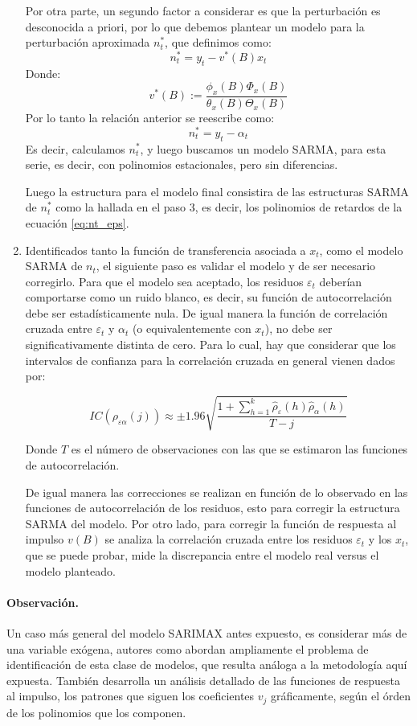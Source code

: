 \documentclass[12pt,oneside]{book}\usepackage[]{graphicx}\usepackage[]{color}
\theoremstyle{definition} %
\begin{document}
\begin{enumerate}
Por otra parte, un segundo factor a considerar es que la perturbación es desconocida a priori, por lo que debemos plantear un modelo para la perturbación aproximada $n_t^{*}$, que definimos como:
$$n_t^{*} = y_t - v^{*}(B)x_t$$
Donde:
$$v^{*}(B):=\frac{ \phi_x(B) \Phi_x(B) }{\theta_x(B) \Theta_x(B)}$$
Por lo tanto la relación anterior se reescribe como:
$$n_t^{*} = y_t -\alpha_t$$
Es decir, calculamos $n_t^{*}$, y luego buscamos un modelo SARMA, para esta serie, es decir, con polinomios estacionales, pero sin diferencias. 

Luego la estructura para el modelo final consistira de las estructuras SARMA de $n_t^{*}$ como la hallada en el paso 3, es decir, los polinomios de retardos de la ecuación \ref{eq:nt_eps}.

\item Identificados tanto la función de transferencia asociada a $x_t$, como el modelo SARMA de $n_t$, el siguiente paso es validar el modelo y de ser necesario corregirlo. Para que el modelo sea aceptado, los residuos $\varepsilon_t$ deberían comportarse como un ruido blanco, es decir, su función de autocorrelación debe ser estadísticamente nula. De igual manera la función de correlación cruzada entre $\varepsilon_t$ y $\alpha_t$ (o equivalentemente con $x_t$), no debe ser significativamente distinta de cero. Para lo cual, hay que considerar que los intervalos de confianza para la correlación cruzada en general vienen dados por:

$$IC(\rho_{\varepsilon\alpha}(j) ) \approx \pm 1.96 \sqrt{ \frac{1+\sum_{h=1}^k \hat\rho_\varepsilon(h) \hat\rho_\alpha(h) }{T-j} } $$

Donde $T$ es el número de observaciones con las que se estimaron las funciones de autocorrelación.

De igual manera las correcciones se realizan en función de lo observado en las funciones de autocorrelación de los residuos, esto para corregir la estructura SARMA del modelo. Por otro lado, para corregir la función de respuesta al impulso $v(B)$ se analiza la correlación cruzada entre los residuos $\varepsilon_t$ y los $x_t$, que se puede probar, mide la discrepancia entre el modelo real versus el modelo planteado.

\end{enumerate}


\paragraph{Observación.} Un caso más general del modelo SARIMAX antes expuesto, es considerar más de una variable exógena, autores como \citeauthor{pankratz2012forecasting} \citeyear{pankratz2012forecasting} abordan ampliamente el problema de identificación de esta clase de modelos, que resulta análoga a la metodología aquí expuesta. También desarrolla un análisis detallado de las funciones de respuesta al impulso, los patrones que siguen los coeficientes $v_j$ gráficamente, según el órden de los polinomios que los componen.
\end{document}

